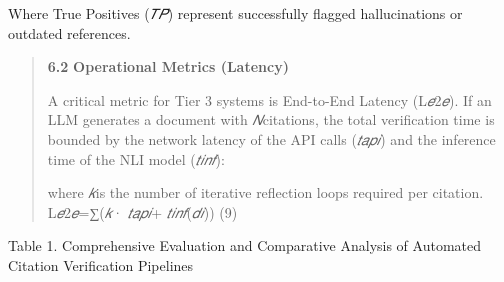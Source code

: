 \documentclass[
]{article}
\begin{document}
Where True Positives (\emph{𝑇𝑃}) represent successfully flagged
hallucinations or outdated references.

\begin{quote}
\textbf{6.2} \textbf{Operational Metrics (Latency)}

A critical metric for Tier 3 systems is End-to-End Latency
(L\emph{𝑒}2\emph{𝑒}). If an LLM generates a document with
\emph{𝑁}citations, the total verification time is bounded by the network
latency of the API calls (\emph{𝑡𝑎𝑝𝑖}) and the inference time of the NLI
model (\emph{𝑡𝑖𝑛𝑓}):

where \emph{𝑘}is the number of iterative reflection loops required per
citation. L\emph{𝑒}2\emph{𝑒}=∑︁(︁\emph{𝑘}· \emph{𝑡𝑎𝑝𝑖}+
\emph{𝑡𝑖𝑛𝑓}(\textbar{}\emph{𝑑𝑖}\textbar))︁ (9)
\end{quote}

Table 1. Comprehensive Evaluation and Comparative Analysis of Automated
Citation Verification Pipelines
\end{document}
